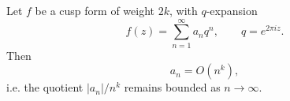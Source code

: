 Let $f$ be a cusp form of weight $2k$, with $q$-expansion
$$f(z) = \sum_{n=1}^{\infty} a_n q^n, \qquad q = e^{2\pi i z}.$$
Then
$$a_n = O(n^k),$$
i.e. the quotient $|a_n|/n^k$ remains bounded as $n \to \infty$.
